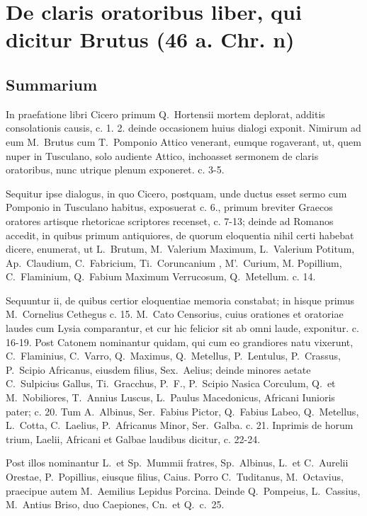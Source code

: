
\section*{De claris oratoribus liber, qui dicitur Brutus (46 a. Chr. n)}

\subsection*{Summarium}

In praefatione libri Cicero primum Q.~Hortensii mortem deplorat, additis consolationis causis, c. 1. 2. deinde occasionem huius dialogi exponit. Nimirum ad eum M.~Brutus cum T.~Pomponio Attico venerant, eumque rogaverant, ut, quem nuper in Tusculano, solo audiente Attico, inchoasset sermonem de claris oratoribus, nunc utrique plenum exponeret. c. 3-5. 

Sequitur ipse dialogus, in quo Cicero, postquam, unde ductus esset sermo cum Pomponio in Tusculano habitus, exposuerat c. 6., primum breviter Graecos oratores artisque rhetoricae scriptores recenset, c. 7-13; deinde ad Romanos accedit, in quibus primum antiquiores, de quorum eloquentia nihil certi habebat dicere, enumerat, ut L.~Brutum, M.~Valerium Maximum, L.~Valerium Potitum, Ap.~Claudium, C.~Fabricium, Ti.~Coruncanium , M'.~Curium, M. Popillium, C.~Flaminium, Q.~Fabium Maximum Verrucosum, Q.~Metellum. c. 14.


Sequuntur ii, de quibus certior eloquentiae memoria constabat; in hisque primus M.~Cornelius Cethegus c. 15. M.~Cato Censorius, cuius orationes et oratoriae laudes cum Lysia comparantur, et cur hic felicior sit ab omni laude, exponitur. c. 16-19. Post Catonem nominantur quidam, qui cum eo grandiores natu vixerunt, C.~Flaminius, C.~Varro, Q.~Maximus, Q.~Metellus, P.~Lentulus, P.~Crassus, P.~Scipio Africanus, eiusdem filius, Sex.~Aelius; deinde minores aetate C.~Sulpicius Gallus, Ti.~Gracchus, P.~F., P.~Scipio Nasica Corculum, Q.\ et M.\ Nobiliores, T.~Annius Luscus, L.~Paulus Macedonicus, Africani Iunioris pater; c. 20. Tum A.~Albinus, Ser.~Fabius Pictor, Q.~Fabius Labeo, Q.~Metellus, L.~Cotta, C.~Laelius, P.~Africanus Minor, Ser.~Galba. c. 21. Inprimis de horum trium, Laelii, Africani et Galbae laudibus dicitur, c. 22-24.

Post illos nominantur L.\ et Sp.~Mummii fratres, Sp.~Albinus, L.\ et C.~Aurelii Orestae, P.~Popillius, eiusque filius, Caius. Porro C.~Tuditanus, M.~Octavius, praecipue autem M.~Aemilius Lepidus Porcina. Deinde Q.~Pompeius, L.~Cassius, M.~Antius Briso, duo Caepiones, Cn.\ et Q.\ c.\ 25.

